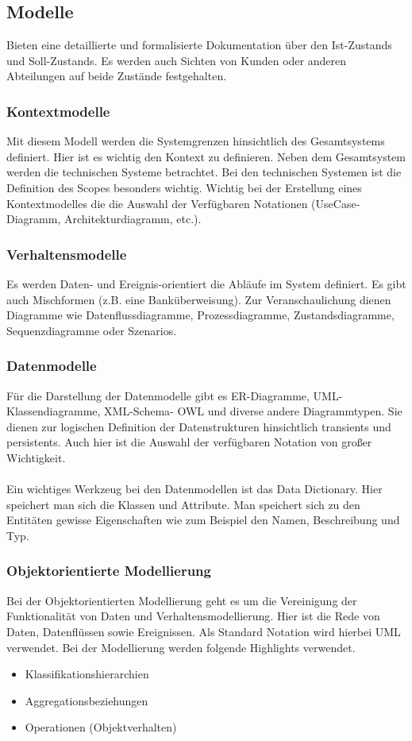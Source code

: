 \subsection{Modelle}
Bieten eine detaillierte und formalisierte Dokumentation über den Ist-Zustands und Soll-Zustands. Es werden auch Sichten von Kunden oder anderen Abteilungen auf beide Zustände festgehalten. 
\subsubsection{Kontextmodelle}
Mit diesem Modell werden die Systemgrenzen hinsichtlich des Gesamtsystems definiert. Hier ist es wichtig den Kontext zu definieren. Neben dem Gesamtsystem werden die technischen Systeme betrachtet. Bei den technischen Systemen ist die Definition des Scopes besonders wichtig. Wichtig bei der Erstellung eines Kontextmodelles die die Auswahl der Verfügbaren Notationen (UseCase-Diagramm, Architekturdiagramm, etc.).

\subsubsection{Verhaltensmodelle}
Es werden Daten- und Ereignis-orientiert die Abläufe im System definiert. Es gibt auch Mischformen (z.B. eine Banküberweisung). Zur Veranschaulichung dienen Diagramme wie Datenflussdiagramme, Prozessdiagramme, Zustandsdiagramme, Sequenzdiagramme oder Szenarios. 

\subsubsection{Datenmodelle}
Für die Darstellung der Datenmodelle gibt es ER-Diagramme, UML-Klassendiagramme, XML-Schema- OWL und diverse andere Diagrammtypen. Sie dienen zur logischen Definition der Datenstrukturen hinsichtlich transients und persistents. Auch hier ist die Auswahl der verfügbaren Notation von großer 
Wichtigkeit.
\\\\
Ein wichtiges Werkzeug bei den Datenmodellen ist das Data Dictionary. Hier speichert man sich die Klassen und Attribute. Man speichert sich zu den Entitäten gewisse Eigenschaften wie zum Beispiel den Namen, Beschreibung und Typ.

\subsubsection{Objektorientierte Modellierung}
Bei der Objektorientierten Modellierung geht es um die Vereinigung der Funktionalität von Daten und Verhaltensmodellierung. Hier ist die Rede von Daten, Datenflüssen sowie Ereignissen. Als Standard Notation wird hierbei UML verwendet. Bei der Modellierung werden folgende Highlights verwendet.
\begin{itemize}
\item Klassifikationshierarchien
\item Aggregationsbeziehungen
\item Operationen (Objektverhalten)
\end{itemize}

